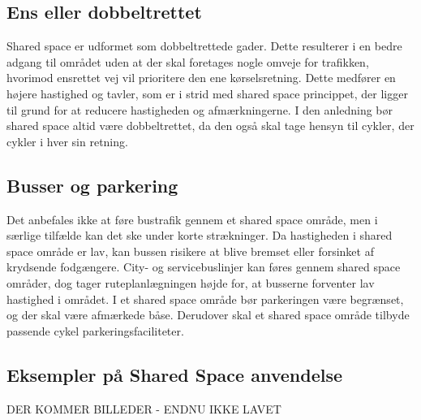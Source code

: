 \subsection{Ens eller dobbeltrettet}
\label{sub:ens_eller_dobbeltrettet}
Shared space er udformet som dobbeltrettede gader. Dette resulterer i en bedre adgang til området uden at der skal foretages nogle omveje for trafikken, hvorimod ensrettet vej vil prioritere den ene kørselsretning. Dette medfører en højere hastighed og tavler, som er i strid med shared space princippet, der ligger til grund for at reducere hastigheden og afmærkningerne. I den anledning bør shared space altid være dobbeltrettet, da den også skal tage hensyn til cykler, der cykler i hver sin retning. %

\subsection{Busser og parkering}
\label{sub:Busser_og_parkering}
Det anbefales ikke at føre bustrafik gennem et shared space område, men i særlige tilfælde kan det ske under korte strækninger.  Da hastigheden i shared space område er lav, kan bussen risikere at blive bremset eller forsinket af krydsende fodgængere. City- og servicebuslinjer kan føres gennem shared space områder, dog tager ruteplanlægningen højde for, at busserne forventer lav hastighed i området.
I et shared space område bør parkeringen være begrænset, og der skal være afmærkede båse. Derudover skal et shared space område tilbyde passende cykel parkeringsfaciliteter. %

\subsection{Eksempler på Shared Space anvendelse}
\label{sub:eks_shared_space}
DER KOMMER BILLEDER - ENDNU IKKE LAVET
